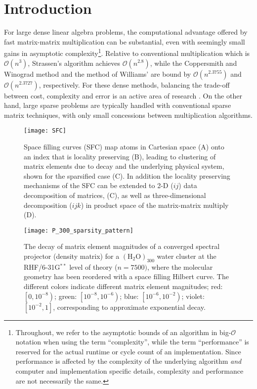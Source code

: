

\section{Introduction}

For large dense linear algebra problems, the computational advantage offered by
fast matrix-matrix multiplication can be substantial, even with seemingly small
gains in asymptotic complexity\footnote{Throughout, we refer to the asymptotic
bounds of an algorithm in big-$\mathcal{O}$ notation when using the term
``complexity'', while the term ``performance'' is reserved for the actual
runtime or cycle count of an implementation. Since performance is affected by
the complexity of the underlying algorithm \emph{and} computer and
implementation specific details, complexity and performance are not
necessarily the same.}.  Relative to conventional multiplication which is
$\mathcal{O} \left( n^{3} \right)$, Strassen's algorithm
\cite{springerlink:10.1007/BF02165411} achieves $\mathcal{O} \left( n^{2.8}
\right)$, while the Coppersmith and Winograd method \cite{Coppersmith1990251}
and the method of Williams' \cite{Williams:2012:MMF:2213977.2214056} are bound
by $\mathcal{O} \left( n^{2.3755} \right)$ and $\mathcal{O} \left( n^{2.3727}
\right)$, respectively. For these dense methods, balancing the trade-off
between cost, complexity and error is an active area of research
\cite{Demmel:1992:FastMM, Demmel:2007:FastMM, Yuster:2005:FastMM}. On the
other hand, large sparse problems are typically handled with conventional
sparse matrix techniques, with only small concessions between multiplication
algorithms.

\begin{figure}
\texttt{[image: SFC]}
\caption{\label{fig:SFC} Space filling curves (SFC) map atoms in Cartesian
space (A) onto an index that is locality preserving (B), leading to clustering
of matrix elements due to decay and the underlying physical system, shown for
the sparsified case (C). In addition the locality preserving mechanisms of the
SFC can be extended to 2-D ($ij$) data decomposition of matrices, (C), as well
as three-dimensional decomposition ($ijk$) in product space of the
matrix-matrix multiply (D).}
\end{figure}

\begin{figure}
\texttt{[image: P\_300\_sparsity\_pattern]}
\caption{\label{fig:sparsity_pattern} The decay of matrix element magnitudes of
a converged spectral projector (density matrix) for a $\left( \mathrm{H}_{2}
\mathrm{O} \right)_{300}$ water cluster at the RHF/6-31G${}^{**}$ level of
theory ($n = 7500)$, where the molecular geometry has been reordered with a
space filling Hilbert curve. The different colors indicate different matrix
element magnitudes; red: $\left[ 0, 10^{-8} \right)$; green: $\left[ 10^{-8},
10^{-6} \right)$; blue: $\left[ 10^{-6}, 10^{-2} \right)$; violet: $\left[
10^{-2}, 1 \right]$, corresponding to approximate exponential decay.}
\end{figure}

